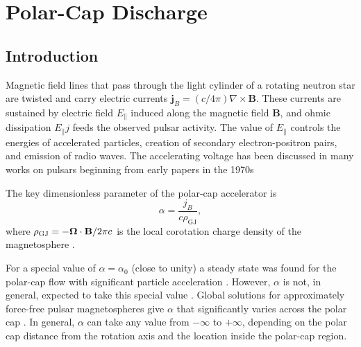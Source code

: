 \def\bB{{\mathbf B}}
\def\bj{{\mathbf j}}
\def\bE{{\mathbf E}}
\def\rhoGJ{\rho_{\rm GJ}}
\def\rpc{r_{\rm pc}}
\def\Apc{A_{\rm pc}}
\def\RLC{R_{\rm LC}}
\def\RNS{R_{\rm NS}}
\def\A{{\cal A}}
\def\B{{\cal B}}
\def\Ntrap{N_{\rm trap}}

\def\beq{\begin{equation}}
\def\eeq{\end{equation}}
\def\Eq{Equation}
\def\Eqs{Equations}
\def\Sect{Section}

\chapter{Polar-Cap Discharge}
\label{chap:polar-cap}

\section{Introduction}

Magnetic field lines that pass through the light cylinder of a rotating neutron
star are twisted and carry electric currents $\mathbf{j}_B=(c/4\pi)\nabla\times\bB$.
These currents are sustained by electric field $E_\parallel$ induced along
the magnetic field $\mathbf{B}$, and ohmic dissipation $E_\parallel j$ feeds the
observed pulsar activity. The value of $E_\parallel$ controls the
energies of accelerated particles, creation of secondary electron-positron
pairs, and emission of radio waves. The accelerating voltage has been discussed in
many works on pulsars beginning from early papers in the 1970s
\citep{sturrock_model_1971, ruderman_theory_1975, goldreich_pulsar_1969}

The key dimensionless parameter of the polar-cap accelerator is
\begin{equation}
\label{eq:alpha}
   \alpha=\frac{j_B}{c\rho_\mathrm{GJ}},
\end{equation}
where $\rho_\mathrm{GJ}=-\bm{\Omega}\cdot\mathbf{B}/2\pi c$ is the local corotation charge density of
the magnetosphere
\citep{goldreich_pulsar_1969}.

For a special value of $\alpha=\alpha_0$ (close to unity) a steady state was
found for the polar-cap flow with significant particle acceleration
\citep{arons_pair_1979,muslimov_general_1992}.
However, $\alpha$ is not, in general, expected to take this special value
\citep[e.g.][]{kennel_pulsar_1979}.
Global solutions for approximately force-free pulsar magnetospheres give
$\alpha$ that significantly varies across the polar cap
\citep{timokhin_force-free_2006}.
In general, $\alpha$ can take any value from $-\infty$ to $+\infty$, depending
on the polar cap distance from the rotation axis and the location inside the
polar-cap region.

